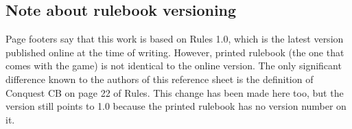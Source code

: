 \documentclass[10pt]{article}
\begin{document}
\subsection*{Note about rulebook versioning}

Page footers say that this work is based on Rules 1.0, which is the latest version published online at the time of writing. However, printed rulebook (the one that comes with the game) is not identical to the online version. The only significant difference known to the authors of this reference sheet is the definition of Conquest CB on page 22 of Rules. This change has been made here too, but the version still points to 1.0 because the printed rulebook has no version number on it.


\end{document}

